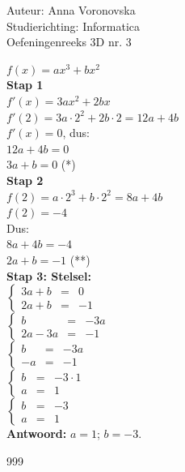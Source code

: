 \documentclass[a4paper]{article}
\begin{document}
\noindent \large Auteur: Anna Voronovska \\
\noindent \large Studierichting: Informatica \\
\noindent \large Oefeningenreeks 3D nr. 3 \\

\bigskip 

\normalsize


$f(x)=ax^3+bx^2$\\

\textbf{Stap 1}\\

$f'(x)= 3ax^2+2bx$\\

$f'(2)=3a \cdot 2^2 + 2b \cdot 2 = 12a+4b$\\

$f'(x)=0$, dus:\\

$12a+4b=0$\\

$3a+b=0$ (*)\\

\textbf{Stap 2}\\

$f(2)=a \cdot 2^3 + b \cdot 2^2=8a+4b$\\

$f(2)=-4$\\

Dus:\\

$8a+4b=-4$\\

$2a+b=-1$ (**)\\

\textbf{Stap 3: Stelsel:} \\

$\left\{
\begin{array}{rcl}
3a + b & = & 0 \\
2a + b & = & -1
\end{array}
\right.$\\

$\left\{
\begin{array}{rcl}
b & = & -3a \\
2a - 3a & = & -1
\end{array}
\right.$\\

$\left\{
\begin{array}{rcl}
b & = & -3a \\
-a & = & -1
\end{array}
\right.$\\

$\left\{
\begin{array}{rcl}
b & = & -3 \cdot 1 \\
a & = & 1
\end{array}
\right.$\\

$\left\{
\begin{array}{rcl}
b & = & -3 \\
a & = & 1
\end{array}
\right.$\\

\textbf{Antwoord:} $a = 1$; $b = -3$.



\begin{thebibliography}{999}
\end{thebibliography}
\end{document}
